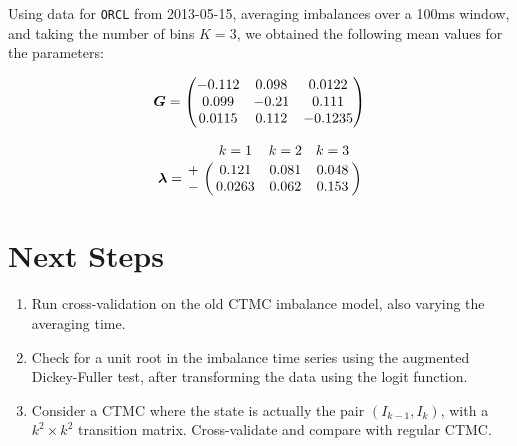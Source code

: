 Using data for \texttt{ORCL} from 2013-05-15, averaging imbalances over a 100ms window, and taking the number
of bins $K=3$, we obtained the following mean values for the parameters:

$$ \boldsymbol{G} = \begin{pmatrix} -0.112 & 0.098 & 0.0122 \\
							0.099 & -0.21 & 0.111 \\
							0.0115 & 0.112 & -0.1235 \end{pmatrix}$$
							
$$ \mat{\lambda} = \bordermatrix{  & k=1    & k=2   & k=3   \cr
								+ & 0.121  & 0.081 & 0.048 \cr
								- & 0.0263 & 0.062 & 0.153 } $$			

\section{Next Steps}
\begin{enumerate}
\item Run cross-validation on the old CTMC imbalance model, also varying the averaging time.
\item Check for a unit root in the imbalance time series using the augmented Dickey-Fuller test, after transforming the data using the logit function.
\item Consider a CTMC where the state is actually the pair $(I_{k-1}, I_k)$, with a $k^2 \times k^2$ transition matrix. Cross-validate and compare with regular CTMC.
\end{enumerate}

